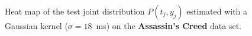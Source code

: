 \documentclass[10pt,a4paper,notitlepage,twocolumn]{article}
\begin{document}
\begin{figure}
\caption{Heat map of the test joint distribution $P(t_j,y_j)$ estimated with a Gaussian kernel ($\sigma=18$~ms) on the {\bf Assassin's Creed} data set.}
\label{fig:ac_2d}
\end{figure}

\begin{figure}
\centering
{}

\end{figure}
\end{document}
